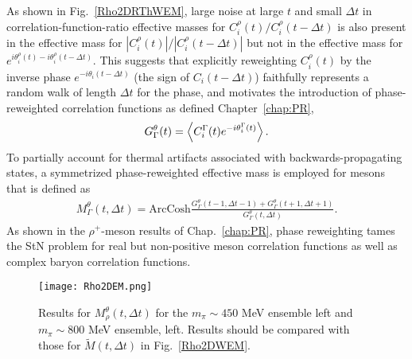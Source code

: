 As shown in Fig.~\ref{Rho2DRThWEM}, large noise at large $t$ and small $\Delta t$ in correlation-function-ratio effective masses for $C_i^\rho(t) / C_i^\rho(t-\Delta t)$ is also present in the effective mass for $|C_i^\rho(t)| / |C_i^\rho(t-\Delta t)|$ but not in the effective mass for $e^{i\theta_i^\rho(t) - i\theta_i^\rho(t-\Delta t)}$.
This suggests that explicitly reweighting $C_i^\rho(t)$ by the inverse phase $e^{-i\theta_i(t-\Delta t)}$ (the sign of $C_i(t-\Delta t)$)
faithfully represents a random walk of length $\Delta t$ for the phase,
and motivates the introduction of phase-reweighted correlation functions as defined Chapter~\ref{chap:PR},
\begin{equation}
  \begin{split}
    G^\theta_\Gamma(t) = \left<  C_i^\Gamma (t) e^{-i\theta_i^\Gamma(t)} \right> .
  \end{split}\label{eq:mesonPR}
\end{equation}
To partially account for thermal artifacts associated with backwards-propagating states, a symmetrized phase-reweighted effective mass is employed for mesons that is defined as
\begin{equation}
  \begin{split}
    M_\Gamma^\theta(t,\Delta t) = \text{ArcCosh} \frac{G_\Gamma^\theta(t - 1, \Delta t - 1) + G_\Gamma^\theta(t+1, \Delta t + 1)}{G_\Gamma^\theta(t, \Delta t)}.
  \end{split}\label{MGammaACdef}
\end{equation}
As shown in the $\rho^+$-meson results of Chap.~\ref{chap:PR}, phase reweighting tames the StN problem for real but non-positive meson correlation functions as well as complex baryon correlation functions.



\begin{figure}[!t]
  \centering
  \texttt{[image: Rho2DEM.png]} 
  \caption{Results for $M_\rho^\theta(t,\Delta t)$ for the $m_\pi \sim 450$ MeV ensemble left and $m_\pi\sim 800$ MeV ensemble, left. Results should be compared with those for $\tilde{M}(t,\Delta t)$ in Fig.~\ref{Rho2DWEM}.}
  \label{Rho2DEM}
\end{figure}

